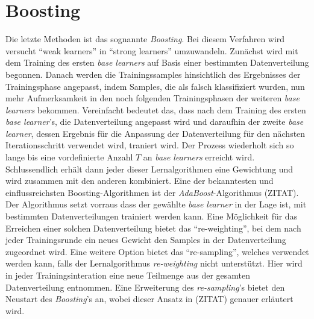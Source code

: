 \section{Boosting}
Die letzte Methoden ist das sognannte \textit{Boosting}. Bei diesem Verfahren wird versucht \enquote{weak learners}\autocite[S.184]{Zhou.2021} in \enquote{strong learners}\autocite[S.184]{Zhou.2021} umzuwandeln. Zunächst wird mit dem Training des ersten \textit{base learners} auf Basis einer bestimmten Datenverteilung begonnen. Danach werden die Trainingssamples hinsichtlich des Ergebnisses der Trainingsphase angepasst, indem Samples, die als falsch klassifiziert wurden, nun mehr Aufmerksamkeit in den noch folgenden Trainingsphasen der weiteren \textit{base learners} bekommen. Vereinfacht bedeutet das, dass nach dem Training des ersten \textit{base learner}'s, die Datenverteilung angepasst wird und daraufhin der zweite \textit{base learner}, dessen Ergebnis für die Anpassung der Datenverteilung für den nächsten Iterationsschritt verwendet wird, traniert wird. Der Prozess wiederholt sich so lange bis eine vordefinierte Anzahl $T$ an \textit{base learners} erreicht wird. Schlussendlich erhält dann jeder dieser Lernalgorithmen eine Gewichtung und wird zusammen mit den anderen kombiniert.
Eine der bekanntesten und einflussreichsten Boosting-Algorithmen ist der \textit{AdaBoost}-Algorithmus (ZITAT). Der Algorithmus setzt vorraus dass der gewählte \textit{base learner} in der Lage ist, mit bestimmten Datenverteilungen trainiert werden kann. Eine Möglichkeit für das Erreichen einer solchen Datenverteilung bietet das \enquote{re-weighting}, bei dem nach jeder Trainingsrunde ein neues Gewicht den Samples in der Datenverteilung zugeordnet wird. Eine weitere Option bietet das \enquote{re-sampling}, welches verwendet werden kann, falls der Lernalgorithmus \textit{re-weighting} nicht unterstützt. Hier wird in jeder Trainingsinteration eine neue Teilmenge aus der gesamten Datenverteilung entnommen. Eine Erweiterung des \textit{re-sampling}'s bietet den Neustart des \textit{Boosting}'s an, wobei dieser Ansatz in (ZITAT) genauer erläutert wird.


